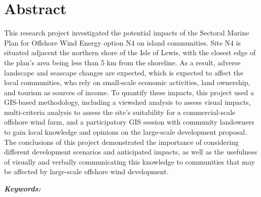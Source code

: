 \chapter*{Abstract}

This research project investigated the potential impacts of the Sectoral Marine
Plan for Offshore Wind Energy option N4 on island communities. Site N4 is
situated adjacent the northern shore of the Isle of Lewis, with the closest
edge of the plan's area being less than 5 km from the shoreline. As a result,
adverse landscape and seascape changes are expected, which is expected to
affect the local communities, who rely on small-scale economic activities, land
ownership, and tourism as sources of income. To quantify these impacts, this
project used a GIS-based methodology, including a viewshed analysis to assess
visual impacts, multi-criteria analysis to assess the site's suitability for a
commercial-scale offshore wind farm, and a participatory GIS session with
community landowners to gain local knowledge and opinions on the large-scale
development proposal. The conclusions of this project demonstrated the
importance of considering different development scenarios and anticipated
impacts, as well as the usefulness of visually and verbally communicating this
knowledge to communities that may be affected by large-scale offshore wind
development.

\noindent\textbf{\textit{Keywords:}} \keywords
